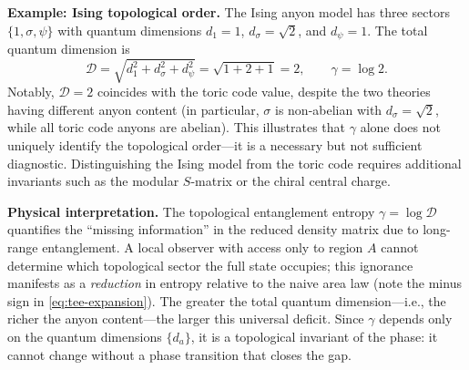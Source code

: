 \medskip
\noindent\textbf{Example: Ising topological order.}
The Ising anyon model has three sectors $\{1, \sigma, \psi\}$ with quantum dimensions $d_1 = 1$, $d_\sigma = \sqrt{2}$, and $d_\psi = 1$.  The total quantum dimension is
\begin{equation}\label{eq:tee-ising}
    \mathcal{D} = \sqrt{d_1^2 + d_\sigma^2 + d_\psi^2} = \sqrt{1 + 2 + 1} = 2, \qquad \gamma = \log 2.
\end{equation}
Notably, $\mathcal{D} = 2$ coincides with the toric code value, despite the two theories having different anyon content (in particular, $\sigma$ is non-abelian with $d_\sigma = \sqrt{2}$, while all toric code anyons are abelian).  This illustrates that $\gamma$ alone does not uniquely identify the topological order---it is a necessary but not sufficient diagnostic.  Distinguishing the Ising model from the toric code requires additional invariants such as the modular $S$-matrix or the chiral central charge.

\medskip
\noindent\textbf{Physical interpretation.}
The topological entanglement entropy $\gamma = \log \mathcal{D}$ quantifies the ``missing information'' in the reduced density matrix due to long-range entanglement.  A local observer with access only to region $A$ cannot determine which topological sector the full state occupies; this ignorance manifests as a \emph{reduction} in entropy relative to the naive area law (note the minus sign in \eqref{eq:tee-expansion}).  The greater the total quantum dimension---i.e., the richer the anyon content---the larger this universal deficit.  Since $\gamma$ depends only on the quantum dimensions $\{d_a\}$, it is a topological invariant of the phase: it cannot change without a phase transition that closes the gap.
